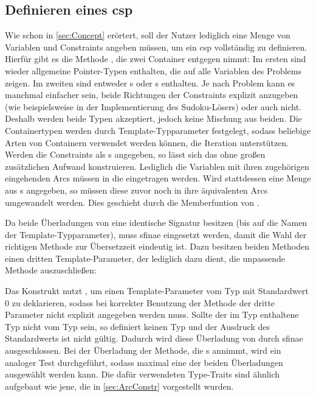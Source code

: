 \subsection{Definieren eines \ac*{csp}}
Wie schon in \cref{sec:Concept} erörtert, soll der Nutzer lediglich eine Menge von Variablen und Constraints angeben müssen, um ein \ac*{csp} vollständig zu definieren. Hierfür
gibt es die Methode , die zwei Container entgegen nimmt: Im ersten sind wieder allgemeine Pointer-Typen enthalten, die auf alle Variablen des Problems zeigen.
Im zweiten sind entweder s oder s enthalten. Je nach Problem kann es manchmal einfacher sein, beide Richtungen der Constraints explizit
anzugeben (wie beispielsweise in der Implementierung des Sudoku-Lösers) oder auch nicht. Deshalb werden beide Typen akzeptiert, jedoch keine Mischung aus beiden. Die Containertypen
werden durch Template-Typparameter festgelegt, sodass beliebige Arten von Containern verwendet werden können, die Iteration unterstützen. Werden die Constraints als
s angegeben, so lässt sich das  ohne großen zusätzlichen Aufwand konstruieren. Lediglich die Variablen mit ihren zugehörigen eingehenden Arcs
müssen in die  eingetragen werden. Wird stattdessen eine Menge aus s angegeben, so müssen diese zuvor noch in ihre äquivalenten
Arcs umgewandelt werden. Dies geschieht durch die Memberfuntion  von .

Da beide Überladungen von  eine identische Signatur besitzen (bis auf die Namen der Template-Typparameter), muss \ac*{sfinae} eingesetzt werden, damit
die Wahl der richtigen Methode zur Übersetzzeit eindeutig ist. Dazu besitzen beiden Methoden einen dritten Template-Parameter, der lediglich dazu dient, die unpassende Methode
auszuschließen:

Das Konstrukt nutzt , um einen Template-Parameter vom Typ  mit Standardwert 0 zu deklarieren, sodass bei korrekter Benutzung der Methode
der dritte Parameter nicht explizit angegeben werden muss. Sollte der im Typ  enthaltene Typ nicht vom Typ  sein, so definiert
 keinen Typ und der Ausdruck des Standardwerts ist nicht gültig. Dadurch wird diese Überladung von  durch \ac*{sfinae}
ausgeschlossen. Bei der Überladung der Methode, die s annimmt, wird ein analoger Test durchgeführt, sodass maximal eine der beiden Überladungen ausgewählt
werden kann. Die dafür verwendeten Type-Traits sind ähnlich aufgebaut wie jene, die in \cref{sec:ArcConstr} vorgestellt wurden.


